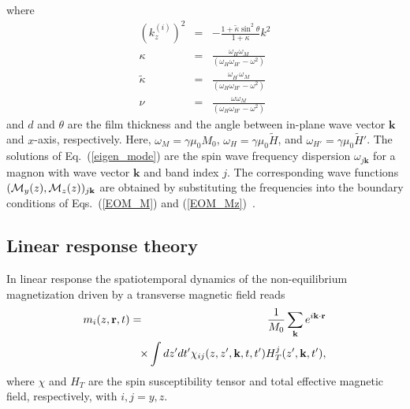 \documentclass[aps,prb,twocolumn,superscriptaddress,floatfix]{revtex4}%
\begin{document}
where 
\begin{eqnarray}
(k_{z}^{(i)})^2&=&-{\frac{1+\tilde{\kappa}\sin^{2}\theta}{1+\kappa}}k^{2}\\
\kappa&=&\frac{\omega_{H}\omega_{M}}{(\omega_{H}\omega_{H'}-\omega^{2})}\\
\tilde \kappa&=&\frac{\omega_{H^\prime}\omega_{M}}{(\omega_{H}\omega_{H'}-\omega^{2})}\\
\nu&=&\frac{\omega\omega_{M}}{(\omega_{H}\omega_{H'}-\omega^{2})}
\end{eqnarray}
and $d$ and $\theta$ are the film thickness and the angle between in-plane wave vector $\mathbf k$ and $x$-axis, respectively. Here, $\omega_{M}=\gamma\mu_{0}M_{0}$, $\omega_{H}=\gamma\mu_{0}{\tilde H}$, and $\omega_{H'}=\gamma\mu_{0}{\tilde H}'$. The solutions of Eq.~(\ref{eigen_mode}) are the spin wave frequency dispersion $\omega_{j\mathbf k}$ for a magnon with wave vector $\mathbf k$ and band index $j$. The corresponding wave functions $({\cal M}_y(z), {\cal M}_z(z))_{j\mathbf k}$ are obtained by substituting the frequencies  into the boundary conditions of Eqs.~(\ref{EOM_M}) and (\ref{EOM_Mz})~\cite{Damon1961}.

\subsection{Linear response theory}
In linear response the spatiotemporal dynamics of the non-equilibrium magnetization driven by a transverse magnetic field reads
\begin{eqnarray}
m_{i}(z,\mathbf{r},t)&=&\frac{1}{M_0}\sum_{\mathbf k}e^{i\mathbf k\cdot\mathbf r}\nonumber\\
&&\hspace{-0.4cm}\times\int dz' dt^{\prime}
\chi_{ij}(z,z',\mathbf k,t,t')
H_T^j(z',\mathbf k,t'), \label{Dym}%
\end{eqnarray}
where $\chi$ and $H_T$ are the spin susceptibility tensor and total effective magnetic field, respectively, with $i,j=y,z$. 
\end{document}
